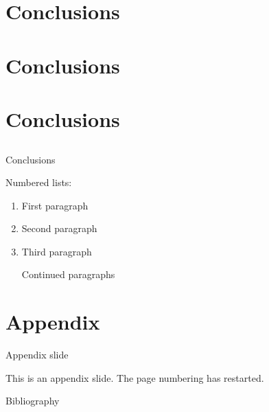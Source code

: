\documentclass[t,12pt,english
\ifx\beamermode\undefined\else,\beamermode\fi
]{beamer}
\renewcommand{\addcontentsline}[3]{}
\newcommand{\notoc}{\AtBeginSection[]{}\AtBeginSubsection[]{}}
\newcommand{\nosupertitle}{\renewcommand{\insertsupertitle}{}}
\newcommand{\insertsupertitle}{}
\begin{document}
\section{Conclusions}\label{conclusions}

\section*{Conclusions}
\addcontentsline{toc}{section}{Conclusions}

\subsection*{}
\addcontentsline{toc}{subsection}{}

\notoc

\section*{Conclusions}
\addcontentsline{toc}{section}{Conclusions}

\subsection*{}
\addcontentsline{toc}{subsection}{}

\nosupertitle

\begin{frame}{Conclusions}

Numbered lists:

\begin{enumerate}
\def\labelenumi{\arabic{enumi}.}
\item
  First paragraph \pause
\item
  Second paragraph
\item
  Third paragraph

  Continued paragraphs
\end{enumerate}

\end{frame}

\section{Appendix}\label{appendix}

\appendix

\begin{frame}{Appendix slide}

This is an appendix slide. The page numbering has restarted.

\end{frame}

\nosupertitle
\begin{frame}[allowframebreaks]{Bibliography}
    \printbibliography
\end{frame}
\end{document}
